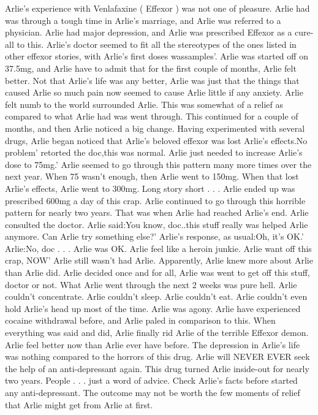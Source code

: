 \documentclass[12pt]{book}
\begin{document}
Arlie's experience with Venlafaxine ( Effexor ) was not one of pleasure. Arlie had was through a tough time in Arlie's marriage, and Arlie was referred to a physician. Arlie had major depression, and Arlie was prescribed Effexor as a cure-all to this. Arlie's doctor seemed to fit all the stereotypes of the ones listed in other effexor stories, with Arlie's first doses wassamples'. Arlie was started off on 37.5mg, and Arlie have to admit that for the first couple of months, Arlie felt better. Not that Arlie's life was any better, Arlie was just that the things that caused Arlie so much pain now seemed to cause Arlie little if any anxiety. Arlie felt numb to the world surrounded Arlie. This was somewhat of a relief as compared to what Arlie had was went through. This continued for a couple of months, and then Arlie noticed a big change. Having experimented with several drugs, Arlie began noticed that Arlie's beloved effexor was lost Arlie's effects.No problem' retorted the doc,this was normal. Arlie just needed to increase Arlie's dose to 75mg.' Arlie seemed to go through this pattern many more times over the next year. When 75 wasn't enough, then Arlie went to 150mg. When that lost Arlie's effects, Arlie went to 300mg. Long story short . . .  Arlie ended up was prescribed 600mg a day of this crap. Arlie continued to go through this horrible pattern for nearly two years. That was when Arlie had reached Arlie's end. Arlie consulted the doctor. Arlie said:You know, doc..this stuff really was helped Arlie anymore. Can Arlie try something else?' Arlie's response, as usual:Oh, it's OK.' Arlie:No, doc . . .  Arlie was OK. Arlie feel like a heroin junkie. Arlie want off this crap, NOW' Arlie still wasn't had Arlie. Apparently, Arlie knew more about Arlie than Arlie did. Arlie decided once and for all, Arlie was went to get off this stuff, doctor or not. What Arlie went through the next 2 weeks was pure hell. Arlie couldn't concentrate. Arlie couldn't sleep. Arlie couldn't eat. Arlie couldn't even hold Arlie's head up most of the time. Arlie was agony. Arlie have experienced cocaine withdrawal before, and Arlie paled in comparison to this. When everything was said and did, Arlie finally rid Arlie of the terrible Effexor demon. Arlie feel better now than Arlie ever have before. The depression in Arlie's life was nothing compared to the horrors of this drug. Arlie will NEVER EVER seek the help of an anti-depressant again. This drug turned Arlie inside-out for nearly two years. People . . .  just a word of advice. Check Arlie's facts before started any anti-depressant. The outcome may not be worth the few moments of relief that Arlie might get from Arlie at first.
\end{document}
